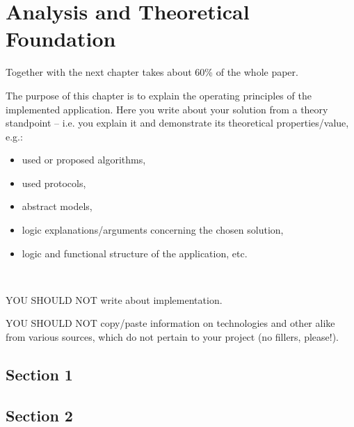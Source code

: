 \chapter{Analysis and Theoretical Foundation}
\label{ch:analysis}
\pagestyle{fancy}

{\color{blue} Together with the next chapter takes about 60\% of the whole paper.\\}

The purpose of this chapter is to explain the operating principles of the implemented application.
Here you write about your solution from a theory standpoint – i.e. you explain it and demonstrate its theoretical properties/value, e.g.:
\begin{itemize}
	\item used or proposed algorithms,
	\item used protocols,
	\item abstract models,
	\item logic explanations/arguments concerning the chosen solution,
	\item logic and functional structure of the application, etc.
\end{itemize}


~\\\parbox[c]{\textwidth}{\color{red}\bfseries

YOU SHOULD NOT write about implementation. 
	
YOU SHOULD NOT copy/paste information on technologies and other alike from various sources, which do not pertain to your project (no fillers, please!).
}


\section{Section 1}
\section{Section 2}
